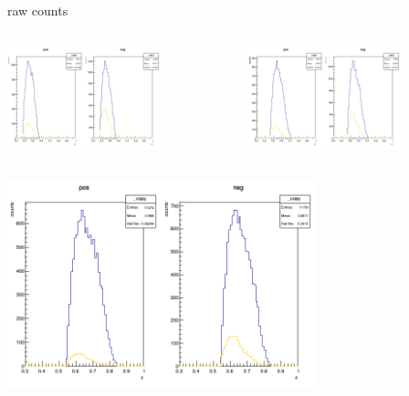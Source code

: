 \begin{frame}{raw counts}
\begin{columns}
\begin{column}[T]{0.5\textwidth}
\includegraphics[width = 0.7\textwidth]{results/yield/statistics/counts_x_Q2_z_0.55_5.500_0.45.png}
\end{column}
\begin{column}[T]{0.5\textwidth}
\includegraphics[width = 0.7\textwidth]{results/yield/statistics/counts_x_Q2_z_0.55_5.500_0.55.png}
\end{column}
\end{columns}
\begin{columns}
\begin{column}[T]{0.5\textwidth}
\includegraphics[width = 0.7\textwidth]{results/yield/statistics/counts_x_Q2_z_0.55_5.500_0.65.png}
\end{column}
\begin{column}[T]{0.5\textwidth}
\end{column}
\end{columns}
\end{frame}
